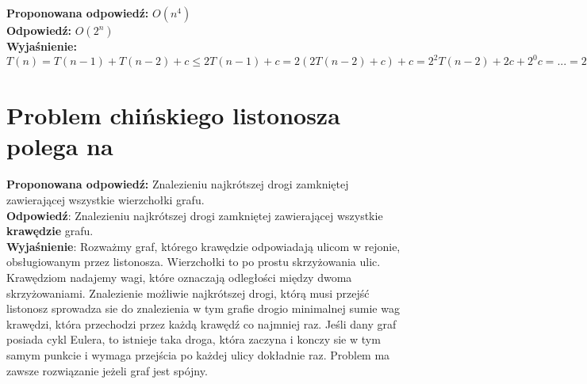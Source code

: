 \vspace{0.4cm}
\noindent \textbf{Proponowana odpowiedź:} $O(n^4)$ \\ 

\noindent \textbf{Odpowiedź:} $O(2^n)$ \\

\noindent \textbf{Wyjaśnienie:}
$T(n) = T(n-1) + T(n-2) + c \leq 2T(n-1) + c = 2(2T(n-2) + c) + c = 2^2T(n-2) + 2c + 2^0c =...= 2^nT(0) + 2^{n-1}c + ... + 2c + 2^0c = c(2^n-1)$ \\


\section{Problem chińskiego listonosza polega na}
\noindent \textbf{Proponowana odpowiedź:} Znalezieniu najkrótszej drogi zamkniętej zawierającej wszystkie wierzchołki grafu. \\

\noindent \textbf{Odpowiedź}:  Znalezieniu najkrótszej drogi zamkniętej zawierającej wszystkie \textbf{krawędzie} grafu. \\

\noindent \textbf{Wyjaśnienie}:
Rozważmy graf, którego krawędzie odpowiadają ulicom w rejonie, obsługiowanym przez listonosza. Wierzchołki to po prostu skrzyżowania ulic. Krawędziom nadajemy wagi, które oznaczają odległości między dwoma skrzyżowaniami. Znalezienie możliwie najkrótszej drogi, którą musi przejść listonosz sprowadza sie do znalezienia w tym grafie drogio minimalnej sumie wag krawędzi, która przechodzi przez każdą krawędź co najmniej raz. Jeśli dany graf posiada cykl Eulera, to istnieje taka droga, która zaczyna i konczy sie w tym samym punkcie i wymaga przejścia po każdej ulicy dokładnie raz. Problem ma zawsze rozwiązanie jeżeli graf jest spójny. 